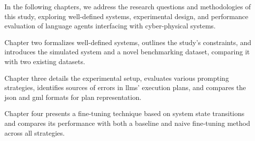 \pskip

In the following chapters, we address the research questions and methodologies of this study, exploring well-defined systems, experimental design, and performance evaluation of language agents interfacing with cyber-physical systems.

\pskip

Chapter two formalizes well-defined systems, outlines the study's constraints, and introduces the simulated system and a novel benchmarking dataset, comparing it with two existing datasets.

\pskip

Chapter three details the experimental setup, evaluates various prompting strategies, identifies sources of errors in \glspl{llm}' execution plans, and compares the \gls{json} and \gls{gml} formats for plan representation.

\pskip

Chapter four presents a fine-tuning technique based on system state transitions and compares its performance with both a baseline and naive fine-tuning method across all strategies.
